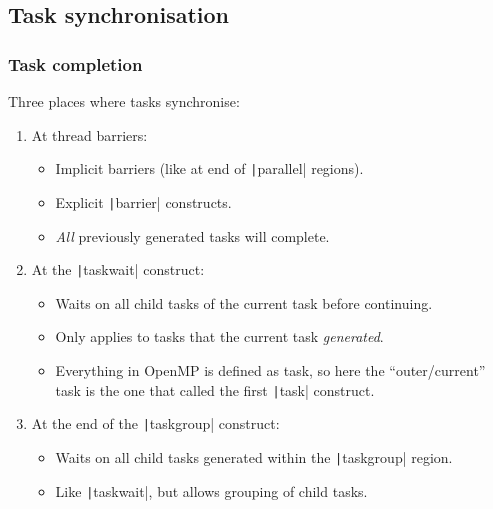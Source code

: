 \documentclass{beamer}
\begin{document}
\subsection{Task synchronisation}
\begin{frame}
\frametitle{Task completion}
Three places where tasks synchronise:
\begin{enumerate}
  \item At thread barriers:
    \begin{itemize}
      \item Implicit barriers (like at end of \texttt|parallel| regions).
      \item Explicit \texttt|barrier| constructs.
      \item \emph{All} previously generated tasks will complete.
    \end{itemize}
  \item At the \texttt|taskwait| construct:
    \begin{itemize}
      \item Waits on all child tasks of the current task before continuing.
      \item Only applies to tasks that the current task \emph{generated}.
      \item Everything in OpenMP is defined as task, so here the ``outer/current'' task is the one that called the first \texttt|task| construct.
    \end{itemize}
  \item At the end of the \texttt|taskgroup| construct:
    \begin{itemize}
      \item Waits on all child tasks generated within the \texttt|taskgroup| region.
      \item Like \texttt|taskwait|, but allows grouping of child tasks.
    \end{itemize}
\end{enumerate}
\end{frame}
\end{document}
